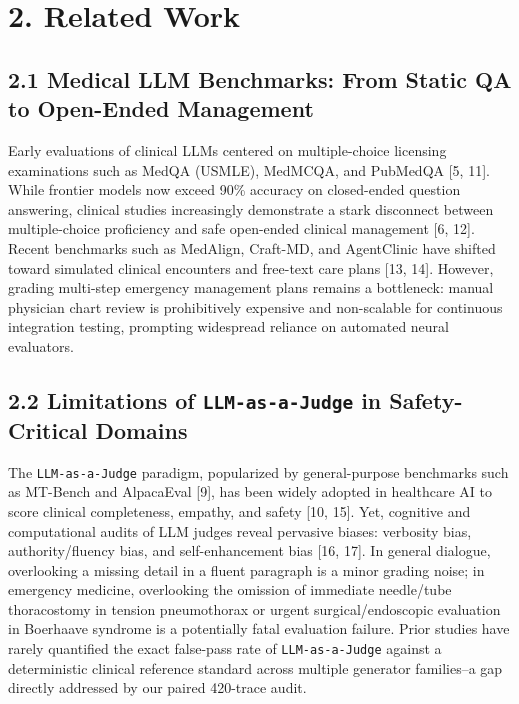 \documentclass[10pt,a4paper]{article}
\begin{document}
\section*{2. Related Work}

\subsection*{2.1 Medical LLM Benchmarks: From Static QA to Open-Ended Management}
Early evaluations of clinical LLMs centered on multiple-choice licensing examinations such as MedQA (USMLE), MedMCQA, and PubMedQA [5, 11]. While frontier models now exceed 90\% accuracy on closed-ended question answering, clinical studies increasingly demonstrate a stark disconnect between multiple-choice proficiency and safe open-ended clinical management [6, 12]. Recent benchmarks such as MedAlign, Craft-MD, and AgentClinic have shifted toward simulated clinical encounters and free-text care plans [13, 14]. However, grading multi-step emergency management plans remains a bottleneck: manual physician chart review is prohibitively expensive and non-scalable for continuous integration testing, prompting widespread reliance on automated neural evaluators.

\subsection*{2.2 Limitations of \texttt{LLM-as-a-Judge} in Safety-Critical Domains}
The \texttt{LLM-as-a-Judge} paradigm, popularized by general-purpose benchmarks such as MT-Bench and AlpacaEval [9], has been widely adopted in healthcare AI to score clinical completeness, empathy, and safety [10, 15]. Yet, cognitive and computational audits of LLM judges reveal pervasive biases: verbosity bias, authority/fluency bias, and self-enhancement bias [16, 17]. In general dialogue, overlooking a missing detail in a fluent paragraph is a minor grading noise; in emergency medicine, overlooking the omission of immediate needle/tube thoracostomy in tension pneumothorax or urgent surgical/endoscopic evaluation in Boerhaave syndrome is a potentially fatal evaluation failure. Prior studies have rarely quantified the exact false-pass rate of \texttt{LLM-as-a-Judge} against a deterministic clinical reference standard across multiple generator families--a gap directly addressed by our paired 420-trace audit.
\end{document}
